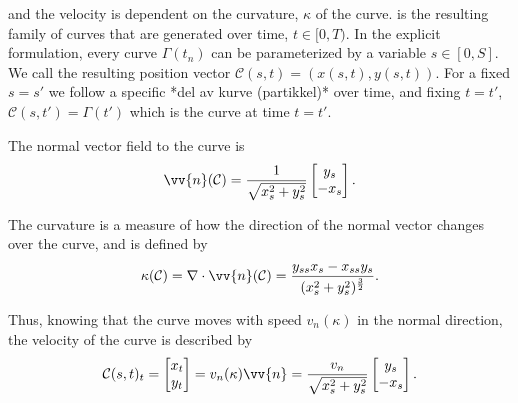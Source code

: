 
and the velocity is dependent on the curvature, $\kappa$ of the curve. \curve is the resulting family of curves that are generated over time, $t\in[0, T)$. In the explicit formulation, every curve $\Gamma(t_n)$ can be parameterized by a variable $s\in[0, S]$. We call the resulting position vector $\mathcal{C}(s, t) = (x(s, t), y(s, t))$. For a fixed $s=s'$ we follow a specific *del av kurve (partikkel)* over time, and fixing $t=t'$, $\mathcal{C}(s, t') = \Gamma(t')$ which is the curve at time $t=t'$.

The normal vector field to the curve is 
\begin{equation}
    \vv{n}(\mathcal{C}) = \frac{1}{\sqrt{x_s^2+y_s^2}}\begin{bmatrix}y_s \\ -x_s \end{bmatrix}.
    \label{eq:parametric-normal}
\end{equation}

The curvature is a measure of how the direction of the normal vector changes over the curve, and is defined by
\begin{equation}
    \kappa(\mathcal{C}) = \nabla \cdot \vv{n}(\mathcal{C}) = \frac{y_{ss}x_s-x_{ss}y_s}{(x_s^2+y_s^2)^{\frac{3}{2}}}.
    \label{eq:parametric-curvature}
\end{equation}

Thus, knowing that the curve moves with speed $v_n(\kappa)$ in the normal direction, the velocity of the curve 
is described by
\begin{equation}
    \mathcal{C}(s, t)_t = \begin{bmatrix}x_t \\ y_t \end{bmatrix} = v_n(\kappa) \vv{n} = \frac{v_n}{\sqrt{x_s^2+y_s^2}}\begin{bmatrix}y_s \\ -x_s \end{bmatrix}.
    \label{eq:parametric-motion-equations}
\end{equation}

